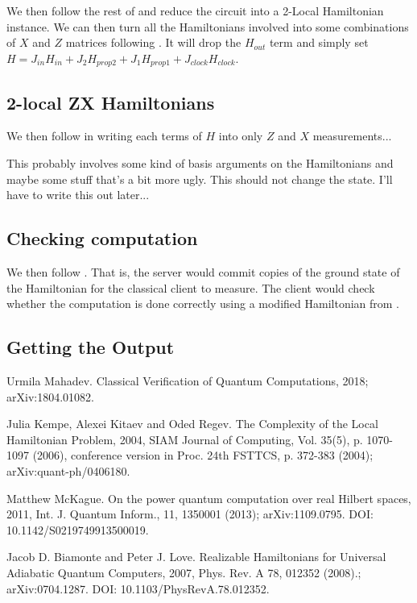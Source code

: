 \documentclass{article}
\theoremstyle{definition}
\begin{document}
We then follow the rest of \cite{quant-ph/0406180} and reduce the circuit into a 2-Local Hamiltonian instance. We can then turn all the Hamiltonians involved into some combinations of $X$ and $Z$ matrices following \cite{0704.1287}.
It will drop the $H_{out}$ term and simply set $H=J_{in}H_{in}+J_2H_{prop2}+J_1H_{prop1}+J_{clock}H_{clock}$.

\subsection{2-local ZX Hamiltonians}

We then follow \cite{0704.1287} in writing each terms of $H$ into only $Z$ and $X$ measurements...

This probably involves some kind of basis arguments on the Hamiltonians and maybe some stuff that's a bit more ugly. This should not change the state. I'll have to write this out later...

\subsection{Checking computation}

We then follow \cite{1804.01082}. That is, the server would commit copies of the ground state of the Hamiltonian for the classical client to measure. The client would check whether the computation is done correctly using a modified Hamiltonian from \cite{quant-ph/0406180}. 


\subsection{Getting the Output}



\begin{thebibliography}{9}
	Urmila Mahadev.
	\newblock Classical Verification of Quantum Computations, 2018;
	\newblock arXiv:1804.01082.

	Julia Kempe, Alexei Kitaev and Oded Regev.
	\newblock The Complexity of the Local Hamiltonian Problem, 2004,
	\newblock SIAM Journal of Computing, Vol. 35(5), p. 1070-1097 (2006),
		conference version in Proc. 24th FSTTCS, p. 372-383 (2004);
	\newblock arXiv:quant-ph/0406180.

	Matthew McKague.
	\newblock On the power quantum computation over real Hilbert spaces, 2011,
	\newblock Int. J. Quantum Inform., 11, 1350001 (2013);
	\newblock arXiv:1109.0795.
	\newblock DOI: 10.1142/S0219749913500019.
	
	Jacob D. Biamonte and Peter J. Love.
	\newblock Realizable Hamiltonians for Universal Adiabatic Quantum Computers, 2007,
	\newblock Phys. Rev. A 78, 012352 (2008).;
	\newblock arXiv:0704.1287.
	\newblock DOI: 10.1103/PhysRevA.78.012352.

\end{thebibliography}
\end{document}
